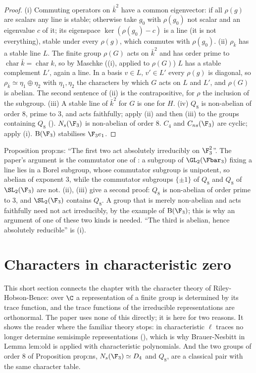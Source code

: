 \begin{proof}
(i) Commuting operators on $\bar k^2$ have a common eigenvector: if all $\rho(g)$ are scalars any line is stable; otherwise take $g_0$
with $\rho(g_0)$ not scalar and an eigenvalue $c$ of it; its eigenspace $\ker(\rho(g_0)-c)$ is a line (it is not everything), stable under
every $\rho(g)$, which commutes with $\rho(g_0)$.
(ii) $\rho_{\bar k}$ has a stable line $L$. The finite group $\rho(G)$ acts on $\bar k^2$ and has order prime to $\operatorname{char}\bar k=\operatorname{char}k$,
so by Maschke ((i), applied to $\rho(G)$) $L$ has a stable complement $L'$, again a line. In a basis $v\in L$, $v'\in L'$
every $\rho(g)$ is diagonal, so $\rho_{\bar k}\simeq\eta_1\oplus\eta_2$ with $\eta_1,\eta_2$ the characters by which $G$ acts on $L$ and $L'$, and $\rho(G)$ is
abelian. The second sentence of (ii) is the contrapositive, for $\rho$ the inclusion of the subgroup.
(iii) A stable line of $\bar k^2$ for $G$ is one for $H$.
(iv) $Q_8$ is non-abelian of order $8$, prime to $3$, and acts faithfully; apply (ii) and then (iii) to the groups containing $Q_8$
(). $N_s(\F_3)$ is non-abelian of order $8$. $C_4$ and $C_{ns}(\F_3)$ are cyclic; apply (i). $\mathrm B(\F_3)$ stabilises $\F_3e_1$.
\end{proof}

\begin{paperlink}
Proposition prop:ns: ``The first two act absolutely irreducibly on $\F_3^2$''. The paper's argument is the commutator one of
: a subgroup of $\GL_2(\Fbar_3)$ fixing a line lies in a Borel subgroup, whose commutator subgroup is unipotent, so abelian
of exponent $3$, while the commutator subgroups $\{\pm1\}$ of $Q_8$ and $Q_8$ of $\SL_2(\F_3)$ are not. (ii), (iii) give
a second proof: $Q_8$ is non-abelian of order prime to $3$, and $\SL_2(\F_3)$ contains $Q_8$. A group that is merely non-abelian and acts faithfully need not act
irreducibly, by the example of $\mathrm B(\F_3)$; this is why an argument of one of these two kinds is needed. ``The third is abelian,
hence absolutely reducible'' is (i).
\end{paperlink}

\section{Characters in characteristic zero}\label{sec:reps:characters}

This short section connects the chapter with the character theory of Riley-Hobson-Bence: over $\C$ a representation of a finite
group is determined by its trace function, and the trace functions of the irreducible representations are orthonormal. The paper
uses none of this directly; it is here for two reasons. It shows the reader where the familiar theory stops: in characteristic $\ell$
traces no longer determine semisimple representations (), which is why Brauer-Nesbitt in Lemma lem:old is
applied with characteristic polynomials. And the two groups of order $8$ of Proposition prop:ns, $N_s(\F_3)\simeq D_4$ and $Q_8$, are a classical pair
with the same character table.

